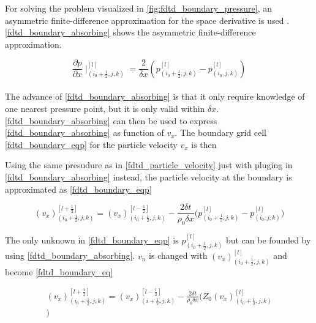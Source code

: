 For solving the problem visualized in \autoref{fig:fdtd_boundary_pressure}, an asymmetric finite-difference approximation for the space derivative is used  \citep{finiteproblems}. \autoref{fdtd_boundary_absorbing} shows the asymmetric finite-difference approximation.

\begin{equation}\label{fdtd_boundary_absorbing}
\frac{\partial p}{\partial x}\mid _{(i_0+\frac{1}{2},j,k)}^{[l]} = \frac{2}{\delta x} \left( p_{(i_0+\frac{1}{2},j,k)}^{[l]}-p_{(i_0,j,k)}^{[l]} \right)
\end{equation}\\

The advance of \autoref{fdtd_boundary_absorbing} is that it only require knowledge of one nearest pressure point, but it is only valid within $\delta x$. \autoref{fdtd_boundary_absorbing} can then be used to express  \autoref{fdtd_boundary_absorbing} as function of $v_x$. The boundary grid cell \autoref{fdtd_boundary_eqp} for the particle velocity $v_x$ is then

Using the same presudure as in \autoref{fdtd_particle_velocity} just with pluging in \autoref{fdtd_boundary_absorbing} instead, the particle velocity at the boundary is approximated as \autoref{fdtd_boundary_eqp}

\begin{equation}\label{fdtd_boundary_eqp}
(v_x)_{(i_0+\frac{1}{2},j,k)}^{[l+\frac{1}{2}]}= (v_x)_{(i_0+\frac{1}{2},j,k)}^{[l-\frac{1}{2}]}-\frac{2 \delta t}{\rho_0 \delta x} \Biggl( 
p_{(i_0+\frac{1}{2},j,k)}^{[l]} -p_{(i_0,j,k)}^{[l]}  \Biggr)
\end{equation}

The only unknown in \autoref{fdtd_boundary_eqp} is $p_{(i_0+\frac{1}{2},j,k)}^{[l]}$ but can be founded by using \autoref{fdtd_boundary_absorbing}. $v_n$ is changed with $(v_x)_{(i_0+\frac{1}{2},j,k)}^{[l]}$ and become \autoref{fdtd_boundary_eq}


\begin{multline}\label{fdtd_boundary_velocity}
(v_x)_{(i_0+\frac{1}{2},j,k)}^{[l+\frac{1}{2}]}= (v_x)_{(i+\frac{1}{2},j,k)}^{[l-\frac{1}{2}]}-\frac{2 \delta t}{\rho_0 \delta x} \Biggl( 
 Z_0(v_x)_{(i_0+\frac{1}{2},j,k)}^{[l]} \\
\Biggr)
\end{multline}


